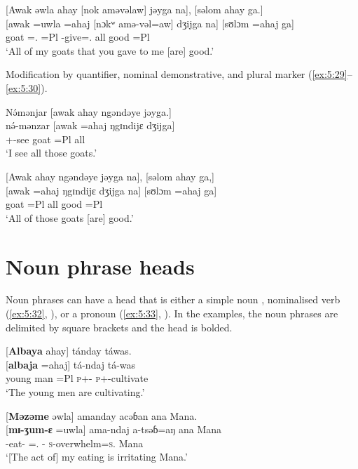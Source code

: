 \ea \label{ex:5:28}
{}[Awak  əwla  ahay  [nok  aməvəlaw]  jəyga  na],  [səlom  ahay  ga.]\\
\gll  {}[awak   =uwla     =ahaj   [nɔkʷ   amə-vəl=aw]   dʒijga   na]   [sʊlɔm   =ahaj   ga]\\
      goat    ={\oneS}.{\POSS}  =Pl  {\twoS}  {\DEP}-give={\oneS}.{\IO}  all  {\PSP}  good  =Pl  {\ADJ}\\
\glt  ‘All of my goats that you gave to me [are] good.’
\z

Modification by quantifier, nominal demonstrative, and plural marker (\ref{ex:5:29}--\ref{ex:5:30}). 

\ea \label{ex:5:29}
N\'{ə}mənjar  [awak  ahay  ngəndəye  jəyga.]\\
\gll  n\'{ə}-mənzar  [awak  =ahaj  ŋgɪndijɛ   dʒijga]\\
      {\oneS}+{\IFV}-see  goat  =Pl  {\DEM}  all\\
\glt  ‘I see all those goats.’
\z

\ea \label{ex:5:30}
{}[Awak  ahay  ngəndəye  jəyga  na],  [səlom  ahay  ga,]\\
\gll  {}[awak   =ahaj   ŋgɪndijɛ   dʒijga   na]   [sʊlɔm   =ahaj   ga]\\
      goat    =Pl  {\DEM}  all  {\PSP}  good  =Pl  {\ADJ}\\
\glt  ‘All of those goats [are] good.’
\z

\section{Noun phrase heads}\label{sec:5.2}
\hypertarget{RefHeading1211601525720847}{}
Noun phrases can have a head that is either a simple noun , nominalised verb (\ref{ex:5:32}, ), or a pronoun (\ref{ex:5:33}, ). In the examples, the noun phrases are delimited by square brackets and the head is bolded. 

\clearpage
\ea \label{ex:5:31}
{}[\textbf{Albaya}  ahay]  tánday  táwas.\\
\gll  {}[\textbf{albaja}  =ahaj]    tá-ndaj    tá-was\\
      {young man}  =Pl    \textsc{p}+{\IFV}-{\PROG}  \textsc{p}+{\IFV}-cultivate\\
\glt  ‘The young men are cultivating.’ 
\z

\ea \label{ex:5:32}
{}[\textbf{Məzəme}  əwla]  amanday  acəɓan  ana  Mana.\\
\gll  {}[\textbf{mɪ-ʒum-ɛ}    =uwla]    ama-ndaj  a-tsəɓ=aŋ    ana   Mana\\
      {\NOM}{}-eat-{\CL}  ={\oneS}.{\POSS}  {\DEP}-{\PROG}  \textsc{s}-overwhelm=\textsc{s}.{\IO}  {\DAT} Mana\\
\glt  ‘[The act of] my eating is irritating Mana.’
\z


